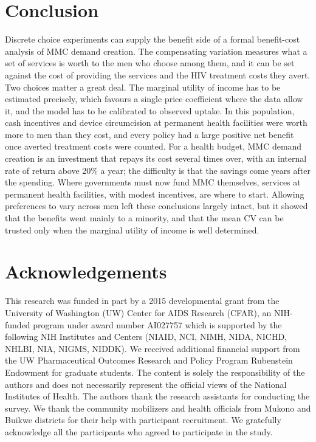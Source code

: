 \documentclass[11pt]{article}
\numberwithin{equation}{section}\numberwithin{figure}{section}\numberwithin{table}{section}
\begin{document}
\section{Conclusion}
Discrete choice experiments can supply the benefit side of a formal benefit-cost analysis of MMC demand creation. The compensating variation measures what a set of services is worth to the men who choose among them, and it can be set against the cost of providing the services and the HIV treatment costs they avert. Two choices matter a great deal. The marginal utility of income has to be estimated precisely, which favours a single price coefficient where the data allow it, and the model has to be calibrated to observed uptake. In this population, cash incentives and device circumcision at permanent health facilities were worth more to men than they cost, and every policy had a large positive net benefit once averted treatment costs were counted. For a health budget, MMC demand creation is an investment that repays its cost several times over, with an internal rate of return above 20\% a year; the difficulty is that the savings come years after the spending. Where governments must now fund MMC themselves, services at permanent health facilities, with modest incentives, are where to start. Allowing preferences to vary across men left these conclusions largely intact, but it showed that the benefits went mainly to a minority, and that the mean CV can be trusted only when the marginal utility of income is well determined.


\section*{Acknowledgements}
This research was funded in part by a 2015 developmental grant from the University of Washington (UW) Center for AIDS Research (CFAR), an NIH-funded program under award number AI027757 which is supported by the following NIH Institutes and Centers (NIAID, NCI, NIMH, NIDA, NICHD, NHLBI, NIA, NIGMS, NIDDK). We received additional financial support from the UW Pharmaceutical Outcomes Research and Policy Program Rubenstein Endowment for graduate students. The content is solely the responsibility of the authors and does not necessarily represent the official views of the National Institutes of Health. The authors thank the research assistants for conducting the survey. We thank the community mobilizers and health officials from Mukono and Buikwe districts for their help with participant recruitment. We gratefully acknowledge all the participants who agreed to participate in the study.
\end{document}
